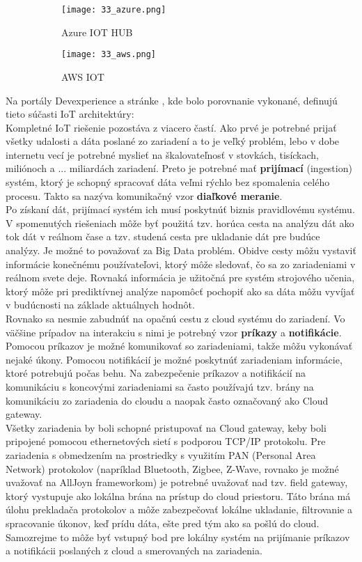 \begin{figure}[!htbp]
\centering
\begin{subfigure}[b]{0.8\textwidth}
\texttt{[image: 33\_azure.png]}
\caption{Azure IOT HUB \cite{IOT22}}
\label{33_azure}
\end{subfigure}
\begin{subfigure}[b]{0.8\textwidth}
\texttt{[image: 33\_aws.png]}
\caption{AWS IOT \cite{IOT22}}
\label{33_aws}
\end{subfigure}
\caption{}
\label{33_aa}
\end{figure}
\indent Na portály Devexperience a stránke \cite{IOT22}, kde bolo porovnanie vykonané, definujú tieto súčasti IoT architektúry: \\
\indent Kompletné IoT riešenie pozostáva z viacero častí. Ako prvé je potrebné prijať všetky udalosti a dáta poslané zo zariadení a to je veľký problém, lebo v dobe internetu vecí je potrebné myslieť na škalovateľnosť v stovkách, tisíckach, miliónoch a ...  miliardách zariadení. Preto je potrebné mať \textbf{prijímací} (ingestion) systém, ktorý je schopný spracovať dáta veľmi rýchlo bez spomalenia celého procesu. Takto sa nazýva komunikačný vzor\textbf{ diaľkové meranie}. \\
\indent Po získaní dát, prijímací systém ich musí poskytnúť biznis pravidlovému systému. V spomenutých riešeniach môže byť použitá tzv. horúca cesta na analýzu dát ako tok dát v reálnom čase a tzv. studená cesta pre ukladanie dát pre budúce analýzy. Je možné to považovať za Big Data problém. Obidve cesty môžu vystaviť informácie konečnému používateľovi, ktorý môže sledovať, čo sa zo zariadeniami v reálnom svete deje. Rovnaká informácia je  užitočná pre systém strojového učenia, ktorý môže pri prediktívnej analýze napomôcť pochopiť ako sa dáta môžu vyvíjať v budúcnosti na základe aktuálnych hodnôt. \\
\indent Rovnako sa nesmie zabudnúť na opačnú cestu z cloud systému do zariadení. Vo väčšine prípadov na interakciu s nimi je potrebný vzor \textbf{príkazy} a \textbf{notifikácie}. Pomocou príkazov je možné komunikovať so zariadeniami, takže môžu vykonávať nejaké úkony. Pomocou notifikácií je možné poskytnúť zariadeniam informácie, ktoré potrebujú počas behu. Na zabezpečenie príkazov a notifikácií na komunikáciu s koncovými zariadeniami sa často používajú tzv. brány na komunikáciu zo zariadenia do cloudu a naopak často označovaný ako Cloud gateway. \\
\indent Všetky zariadenia by boli schopné pristupovať na Cloud gateway, keby boli pripojené pomocou ethernetových sietí s podporou TCP/IP protokolu. Pre zariadenia s obmedzením na prostriedky s využitím PAN (Personal Area Network) protokolov (napríklad Bluetooth, Zigbee, Z-Wave, rovnako je možné uvažovať na AllJoyn frameworkom) je potrebné uvažovať nad tzv. field gateway, ktorý vystupuje ako lokálna brána na prístup do cloud priestoru. Táto brána má úlohu prekladača protokolov a môže zabezpečovať lokálne ukladanie, filtrovanie a spracovanie úkonov, keď prídu dáta, ešte pred tým ako sa pošlú do cloud. Samozrejme to môže byť vstupný bod pre lokálny systém na prijímanie príkazov a notifikácii poslaných z cloud a smerovaných na zariadenia. \cite{IOT22}

